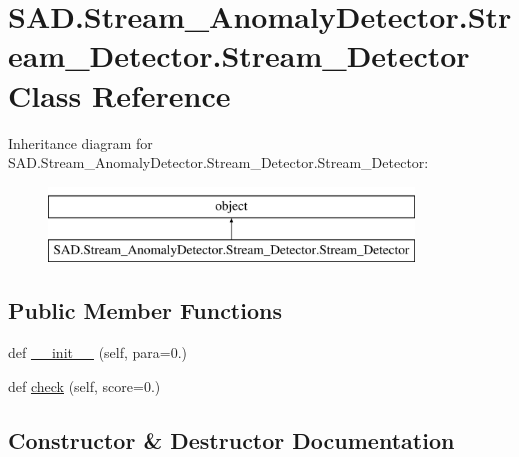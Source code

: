 \hypertarget{classSAD_1_1Stream__AnomalyDetector_1_1Stream__Detector_1_1Stream__Detector}{}\section{S\+A\+D.\+Stream\+\_\+\+Anomaly\+Detector.\+Stream\+\_\+\+Detector.\+Stream\+\_\+\+Detector Class Reference}
\label{classSAD_1_1Stream__AnomalyDetector_1_1Stream__Detector_1_1Stream__Detector}
Inheritance diagram for S\+A\+D.\+Stream\+\_\+\+Anomaly\+Detector.\+Stream\+\_\+\+Detector.\+Stream\+\_\+\+Detector\+:\begin{figure}[H]
\begin{center}
\leavevmode
\includegraphics[height=2.000000cm]{classSAD_1_1Stream__AnomalyDetector_1_1Stream__Detector_1_1Stream__Detector}
\end{center}
\end{figure}
\subsection*{Public Member Functions}
\begin{DoxyCompactItemize}
\item 
def \hyperlink{classSAD_1_1Stream__AnomalyDetector_1_1Stream__Detector_1_1Stream__Detector_ab0755de610c22dfb6b2bbdfce4ec5d67}{\+\_\+\+\_\+init\+\_\+\+\_\+} (self, para=0.)
\item 
def \hyperlink{classSAD_1_1Stream__AnomalyDetector_1_1Stream__Detector_1_1Stream__Detector_ab1cad60e8f3996d3cf8aae56111f356b}{check} (self, score=0.)
\end{DoxyCompactItemize}


\subsection{Constructor \& Destructor Documentation}
